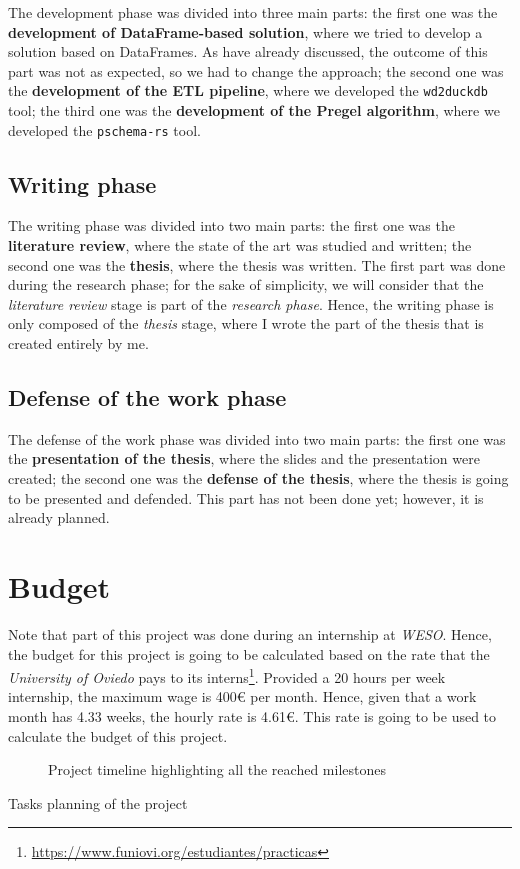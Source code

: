 The development phase was divided into three main parts: the first one was the \textbf{development of DataFrame-based solution}, where we tried to develop a solution based on DataFrames. As have already discussed, the outcome of this part was not as expected, so we had to change the approach; the second one was the \textbf{development of the ETL pipeline}, where we developed the \texttt{wd2duckdb} tool; the third one was the \textbf{development of the Pregel algorithm}, where we developed the \texttt{pschema-rs} tool.

\subsection{Writing phase}

The writing phase was divided into two main parts: the first one was the \textbf{literature review}, where the state of the art was studied and written; the second one was the \textbf{thesis}, where the thesis was written. The first part was done during the research phase; for the sake of simplicity, we will consider that the \textit{literature review} stage is part of the \textit{research phase}. Hence, the writing phase is only composed of the \textit{thesis} stage, where I wrote the part of the thesis that is created entirely by me.

\subsection{Defense of the work phase}

The defense of the work phase was divided into two main parts: the first one was the \textbf{presentation of the thesis}, where the slides and the presentation were created; the second one was the \textbf{defense of the thesis}, where the thesis is going to be presented and defended. This part has not been done yet; however, it is already planned.

\section{Budget}

Note that part of this project was done during an internship at \textit{WESO}. Hence, the budget for this project is going to be calculated based on the rate that the \textit{University of Oviedo} pays to its interns\footnote{\url{https://www.funiovi.org/estudiantes/practicas}}. Provided a 20 hours per week internship, the maximum wage is 400€ per month. Hence, given that a work month has 4.33 weeks, the hourly rate is 4.61€. This rate is going to be used to calculate the budget of this project.

\begin{figure}[p]
    \centering
    
    \caption{Project timeline highlighting all the reached milestones}
    \label{fig:timeline}
\end{figure}

\begin{table}[p]
    \centering
    
    \caption{Tasks planning of the project}
    \label{tab:timeline}
\end{table}